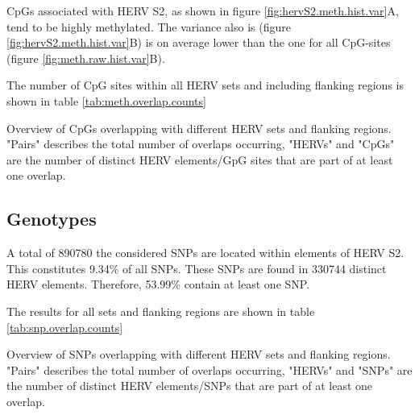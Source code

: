 \documentclass[a4paper,12pt,twoside,openright]{report}
\begin{document}
CpGs associated with HERV S2, as shown in figure \ref{fig:hervS2.meth.hist.var}A, tend to be highly methylated. The variance also is (figure \ref{fig:hervS2.meth.hist.var}B) is on average lower than the one for all CpG-sites (figure \ref{fig:meth.raw.hist.var}B).

The number of CpG sites within all HERV sets and including flanking regions is shown in table \ref{tab:meth.overlap.counts}

\begin{table}[h!]
  \begin{center}
  \end{center}        
	\caption{Overview of CpGs overlapping with different HERV sets and flanking regions. "Pairs" describes the total number of overlaps occurring, "HERVs" and "CpGs" are the number of distinct HERV elements/GpG sites that are part of at least one overlap.}
	\label{tab:meth.overlap.counts}
\end{table} 
\subsection{Genotypes}
A total of 890780 the considered SNPs are located within elements of HERV S2. This constitutes 9.34\% of all SNPs. These SNPs are found in 330744 distinct HERV elements. Therefore, 53.99\% contain at least one SNP.

The results for all sets and flanking regions are shown in table \ref{tab:snp.overlap.counts}

\begin{table}[h!]
  \begin{center}
  \end{center}        
	\caption{Overview of SNPs overlapping with different HERV sets and flanking regions. "Pairs" describes the total number of overlaps occurring, "HERVs" and "SNPs" are the number of distinct HERV elements/SNPs that are part of at least one overlap.}
	\label{tab:snp.overlap.counts}
\end{table} 
\end{document}
